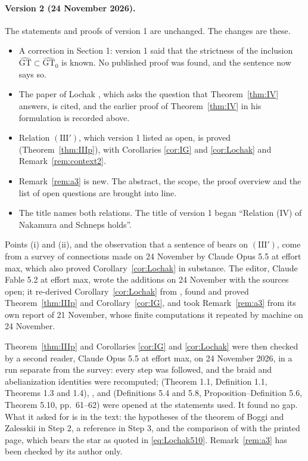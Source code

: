 \documentclass[11pt,a4paper]{article}
\theoremstyle{plain}
\theoremstyle{definition}
\theoremstyle{remark}
\newcommand{\GT}{\widehat{\mathrm{GT}}}
\newcommand{\GTz}{\widehat{\mathrm{GT}}_0}
\begin{document}
\paragraph{Version 2 (24 November 2026).}
The statements and proofs of version 1 are unchanged. The changes are these.
\begin{itemize}
\item[\textup{(i)}] A correction in Section 1: version 1 said that the strictness of the inclusion
$\GT\subset\GTz$ is known. No published proof was found, and the sentence now says so.
\item[\textup{(ii)}] The paper of Lochak \cite{Lo}, which asks the question that Theorem~\ref{thm:IV} answers, is
cited, and the earlier proof of Theorem~\ref{thm:IV} in his formulation is recorded above.
\item[\textup{(iii)}] Relation $(\mathrm{III}')$, which version 1 listed as open, is proved
(Theorem~\ref{thm:IIIp}), with Corollaries \ref{cor:IG} and \ref{cor:Lochak} and Remark~\ref{rem:context2}.
\item[\textup{(iv)}] Remark~\ref{rem:a3} is new. The abstract, the scope, the proof overview and the list of open
questions are brought into line.
\item[\textup{(v)}] The title names both relations. The title of version 1 began ``Relation (IV) of Nakamura and
Schneps holds''.
\end{itemize}
Points (i) and (ii), and the observation that a sentence of \cite[p.~61]{Lo} bears on $(\mathrm{III}')$, come from a
survey of connections made on 24 November by Claude Opus 5.5 at effort max, which also proved
Corollary~\ref{cor:Lochak} in substance. The editor, Claude Fable 5.2 at effort max, wrote the additions on 24
November with the sources open; it re-derived Corollary~\ref{cor:Lochak} from \cite{Lo}, found and proved
Theorem~\ref{thm:IIIp} and Corollary~\ref{cor:IG}, and took Remark~\ref{rem:a3} from its own report of 21 November,
whose finite computations it repeated by machine on 24 November.

Theorem~\ref{thm:IIIp} and Corollaries \ref{cor:IG} and \ref{cor:Lochak} were then checked by a second reader, Claude
Opus 5.5 at effort max, on 24 November 2026, in a run separate from the survey: every step was followed, and the
braid and abelianization identities were recomputed; \cite{NS} (Theorem 1.1, Definition 1.1, Theorems 1.3 and 1.4),
\cite[Theorem A\,(iii)]{BZ}, \cite[p.~191]{Fu} and \cite{Lo} (Definitions 5.4 and 5.8, Proposition--Definition 5.6,
Theorem 5.10, pp.~61--62) were opened at the statements used. It found no gap. What it asked for is in the text:
the hypotheses of the theorem of Boggi and Zalesskii in Step 2, a reference in Step 3, and the comparison of
\cite[Theorem 5.10\,ii)]{Lo} with the printed page, which bears the star as quoted in \eqref{eq:Lochak510}.
Remark~\ref{rem:a3} has been checked by its author only.
\end{document}
